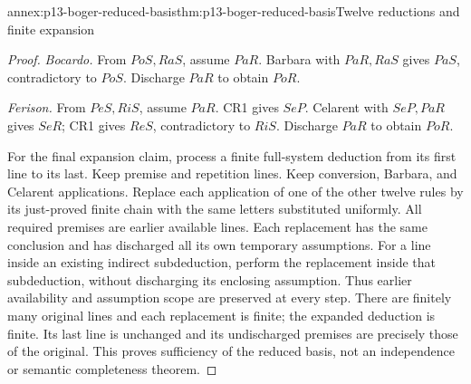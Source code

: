 \begin{annexitem}{annex:p13-boger-reduced-basis}{thm:p13-boger-reduced-basis}{Twelve reductions and finite expansion}
\begin{proof}
\emph{Bocardo.} From \(PoS,RaS\), assume \(PaR\).
Barbara with \(PaR,RaS\) gives \(PaS\), contradictory to \(PoS\).
Discharge \(PaR\) to obtain \(PoR\).

\emph{Ferison.} From \(PeS,RiS\), assume \(PaR\).
CR1 gives \(SeP\). Celarent with \(SeP,PaR\) gives \(SeR\);
CR1 gives \(ReS\), contradictory to \(RiS\).
Discharge \(PaR\) to obtain \(PoR\).

For the final expansion claim, process a finite full-system deduction from
its first line to its last. Keep premise and repetition lines. Keep conversion,
Barbara, and Celarent applications. Replace each application of one of
the other twelve rules by its just-proved finite chain with the same letters
substituted uniformly. All required premises are earlier available lines.
Each replacement has the same conclusion and has discharged all its own
temporary assumptions. For a line inside an existing indirect subdeduction,
perform the replacement inside that subdeduction, without discharging
its enclosing assumption. Thus earlier availability and assumption scope
are preserved at every step. There are finitely many original lines and
each replacement is finite; the expanded deduction is finite. Its last
line is unchanged and its undischarged premises are precisely those of
the original. This proves sufficiency of the reduced basis, not an
independence or semantic completeness theorem.
\end{proof}
\end{annexitem}

